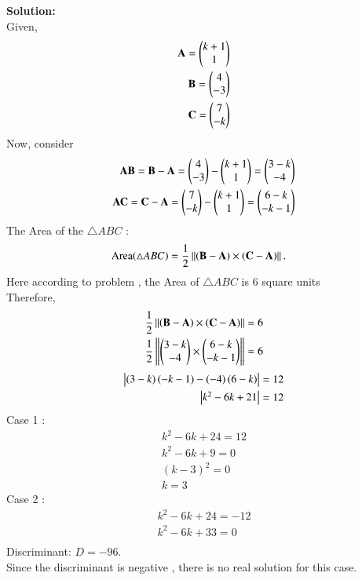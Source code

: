 \documentclass[journal]{IEEEtran}
\begin{document}
\textbf{Solution:}
\\
Given,
\begin{align}
    \mathbf{A}=\begin{pmatrix}k+1\\1\end{pmatrix}\\
    \mathbf{B}=\begin{pmatrix}4\\-3\end{pmatrix}\\
    \mathbf{C}=\begin{pmatrix}7\\-k\end{pmatrix}
\end{align}
Now, consider 
\begin{align}
\mathbf{AB}= \mathbf{B}-\mathbf{A}=\begin{pmatrix}4\\-3\end{pmatrix} - \begin{pmatrix}k+1\\1\end{pmatrix} = \begin{pmatrix}3-k\\-4\end{pmatrix}\\
\mathbf{AC}= \mathbf{C}-\mathbf{A}= \begin{pmatrix}7\\-k\end{pmatrix} - \begin{pmatrix}k+1\\1\end{pmatrix} = \begin{pmatrix}6-k\\-k-1\end{pmatrix}
\end{align}
The Area of the $\triangle$$ABC$ :
\begin{align}
\text{Area\ensuremath{\left(\triangle ABC\right)}}&=\frac{1}{2}\left\lVert\left(\mathbf{B}-\mathbf{A}\right)\times\left(\mathbf{C}-\mathbf{A}\right)\right\rVert. 
\end{align}
Here according to problem , the Area of $\triangle$$ABC$ is $6$ square units\\
Therefore,
\begin{align}
\frac{1}{2}\left\lVert\left(\mathbf{B}-\mathbf{A}\right)\times\left(\mathbf{C}-\mathbf{A}\right)\right\rVert=6\\
\frac{1}{2}\left\lVert\begin{pmatrix}3-k\\-4\end{pmatrix}\times\begin{pmatrix}6-k\\-k-1\end{pmatrix}\right\rVert=6
\end{align}
\begin{align}
\mdet{\brak{3-k}\brak{-k-1} - \brak{-4}\brak{6-k}}=12 \\
\mdet{k^2-6k+21}=12
\end{align}
Case 1 :
\begin{align}
   k^2-6k+24=12\\
k^2-6k+9=0\\
(k-3)^2=0\\
k=3
\end{align}
Case 2 :
\begin{align}
k^2-6k+24=-12\\
k^2-6k+33=0\\
\end{align}
Discriminant: $D=-96$.\\ Since the discriminant is negative , there is no real solution for this case.\\
\end{document}
